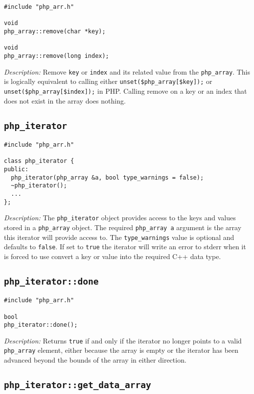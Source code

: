 \documentclass[11pt,titlepage]{article}
\begin{document}
\begin{verbatim}
#include "php_arr.h"

void 
php_array::remove(char *key);

void 
php_array::remove(long index);
\end{verbatim}

\emph{Description:} Remove \verb|key| or \verb|index| and its related value from the \verb|php_array|. This is logically equivalent to calling either \verb|unset($php_array[$key]);| or \verb|unset($php_array[$index]);| in PHP. Calling remove on a key or an index that does not exist in the array does nothing.


\subsection{\texttt{php\_iterator}}

\begin{verbatim}
#include "php_arr.h"

class php_iterator {
public:
  php_iterator(php_array &a, bool type_warnings = false);
  ~php_iterator();
  ...
};
\end{verbatim}

\emph{Description:} The \verb|php_iterator| object provides access to the keys and values stored in a \verb|php_array| object. The required \verb|php_array a| argument is the array this iterator will provide access to. The \verb|type_warnings| value is optional and defaults to \verb|false|. If set to \verb|true| the iterator will write an error to stderr when it is forced to use convert a key or value into the required C++ data type.


\subsection{\texttt{php\_iterator::done}}

\begin{verbatim}
#include "php_arr.h"

bool 
php_iterator::done();
\end{verbatim}

\emph{Description:} Returns \verb|true| if and only if the iterator no longer points to a valid \verb|php_array| element, either because the array is empty or the iterator has been advanced beyond the bounds of the array in either direction.


\subsection{\texttt{php\_iterator::get\_data\_array}}
\end{document}
